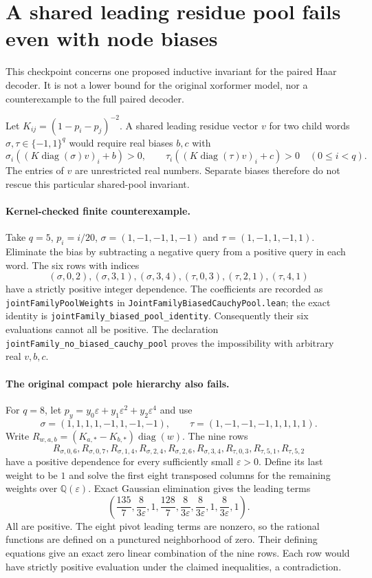 \section{A shared leading residue pool fails even with node biases}

This checkpoint concerns one proposed inductive invariant for the paired Haar
decoder.  It is not a lower bound for the original xorformer model, nor a
counterexample to the full paired decoder.

Let $K_{ij}=(1-p_i-p_j)^{-2}$.  A shared leading residue vector $v$ for two
child words $\sigma,\tau\in\{-1,1\}^q$ would require real biases $b,c$ with
\[
 \sigma_i((K\operatorname{diag}(\sigma)v)_i+b)>0,
 \qquad
 \tau_i((K\operatorname{diag}(\tau)v)_i+c)>0
 \quad(0\leq i<q).
\]
The entries of $v$ are unrestricted real numbers.  Separate biases therefore
do not rescue this particular shared-pool invariant.

\paragraph{Kernel-checked finite counterexample.}
Take $q=5$, $p_i=i/20$,
$\sigma=(1,-1,-1,1,-1)$ and $\tau=(1,-1,1,-1,1)$.
Eliminate the bias by subtracting a negative query from a positive query in
each word.  The six rows with indices
\[
 (\sigma,0,2), (\sigma,3,1), (\sigma,3,4),
 (\tau,0,3), (\tau,2,1), (\tau,4,1)
\]
have a strictly positive integer dependence.  The coefficients are recorded
as \texttt{jointFamilyPoolWeights} in
\texttt{JointFamilyBiasedCauchyPool.lean}; the exact identity is
\texttt{jointFamily\_biased\_pool\_identity}.  Consequently their six
evaluations cannot all be positive.  The declaration
\texttt{jointFamily\_no\_biased\_cauchy\_pool} proves the impossibility
with arbitrary real $v,b,c$.

\paragraph{The original compact pole hierarchy also fails.}
For $q=8$, let
$p_y=y_0\varepsilon+y_1\varepsilon^2+y_2\varepsilon^4$ and use
\[
 \sigma=(1,1,1,1,-1,1,-1,-1),\qquad
 \tau=(1,-1,-1,-1,1,1,1,1).
\]
Write $R_{w,a,b}=(K_{a,*}-K_{b,*})\operatorname{diag}(w)$.
The nine rows
\[
 R_{\sigma,0,6}, R_{\sigma,0,7}, R_{\sigma,1,4},
 R_{\sigma,2,4}, R_{\sigma,2,6}, R_{\sigma,3,4},
 R_{\tau,0,3}, R_{\tau,5,1}, R_{\tau,5,2}
\]
have a positive dependence for every sufficiently small
$\varepsilon>0$.  Define its last weight to be $1$ and solve the first
eight transposed columns for the remaining weights over
$\mathbb Q(\varepsilon)$.  Exact Gaussian elimination gives the leading
terms
\[
 \left(\frac{135}{7},\frac{8}{3\varepsilon},1,
 \frac{128}{7},\frac{8}{3\varepsilon},\frac{8}{3\varepsilon},
 1,\frac{8}{3\varepsilon},1\right).
\]
All are positive.  The eight pivot leading terms are nonzero, so the
rational functions are defined on a punctured neighborhood of zero.
Their defining equations give an exact zero linear combination of the
nine rows.  Each row would have strictly positive evaluation under the
claimed inequalities, a contradiction.

